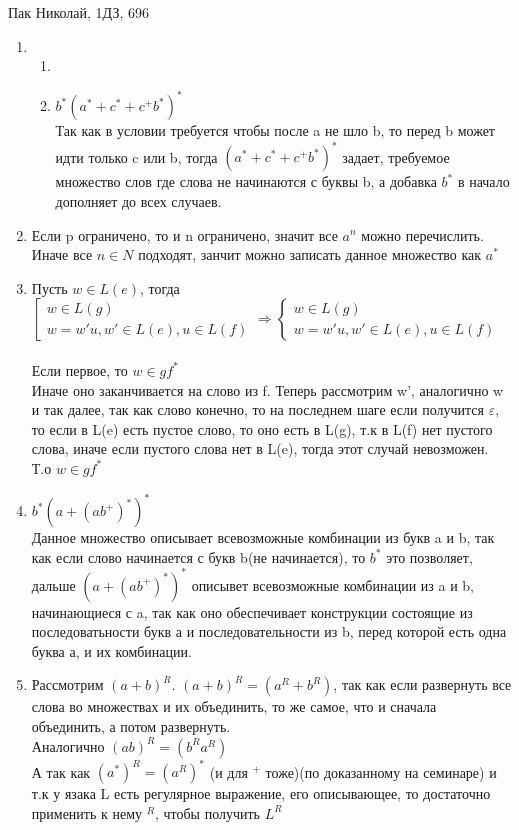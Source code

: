 \documentclass{article}
\begin{document}
\large
	Пак Николай, 1ДЗ, 696\\
	\begin{enumerate}
		\item 
			\begin{enumerate}
				\item 
				\item
					$b^*(a^* + c^* + c^+b^*)^*$\\
					Так как в условии требуется чтобы после a не шло b, то перед b может идти только c или b, тогда $(a^* + c^* + c^+b^*)^*$ задает, требуемое множество слов где слова не начинаются с буквы b, а добавка $b^*$ в начало дополняет до всех случаев.  
						
			\end{enumerate}
		\item 
			Если p ограничено, то и n ограничено, значит все $a^n$ можно перечислить. Иначе все $n \in N$ подходят, занчит можно записать данное множество как $a^*$
		\item
			Пусть $w \in L(e)$, тогда 
			$\left[ 
			\begin{gathered} 
			 w \in L(g)\\
			 w = w'u, w' \in L(e), u \in L(f)
			\end{gathered}  \Rightarrow
			\left\{ 
		\begin{gathered} 
		w \in L(g)\\
		w = w'u, w' \in L(e), u \in L(f)
		\end{gathered} 
			
						\right.$\\\\
			Если первое, то $w \in gf^*$\\ 
			Иначе оно заканчивается на слово из f. Теперь рассмотрим w', аналогично w и так далее, так как слово конечно, то на последнем шаге если получится $\varepsilon$, то если в L(e) есть пустое слово, то оно есть в L(g), т.к в L(f) нет пустого слова, иначе если пустого слова нет в L(e), тогда этот случай невозможен. Т.о $w \in gf^*$ 	  
		\item
			$b^*(a + (ab^+)^*)^*$\\
			Данное множество описывает всевозможные комбинации из букв a и b, так как если слово начинается с букв b(не начинается), то $b^*$ это позволяет, дальше $(a + (ab^+)^*)^*$ описывет всевозможные комбинации из a и b, начинающиеся с a, так как оно обеспечивает конструкции состоящие из последоватьности букв а и последовательности из b, перед которой есть одна буква а, и их комбинации.
		\item
			Рассмотрим $(a+b)^R$. $(a+b)^R = (a^R + b^R)$, так как если развернуть все слова во множествах и их объединить, то же самое, что и сначала объединить, а потом развернуть.\\
			Аналогично $(ab)^R = (b^Ra^R)$\\
			А так как $(a^*)^R = (a^R)^*$ (и для $^+$ тоже)(по доказанному на семинаре) и т.к у язака L есть регулярное выражение, его описывающее, то достаточно применить к нему $^R$, чтобы получить $L^R$
	\end{enumerate}
 
\end{document}
